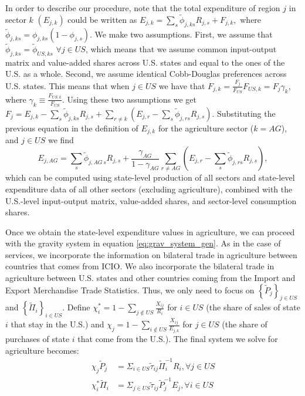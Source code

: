 \documentclass[12pt]{article}
\newcommand{\bs}{\small \begin{eqnarray*}}
\newcommand{\es}{\end{eqnarray*}}
\begin{document}
In order to describe our procedure, note that the total expenditure of region $j$ in sector $k$ $(E_{j,k})$ could be written as  $E_{j,k}=\sum_{s}\tilde{\phi}_{j,ks}R_{j,s}+F_{j,k},$ where $\tilde{\phi}_{j,ks}=\phi_{j,ks}(1-\phi_{j,s})$. We make two assumptions. First, we assume that $\tilde{\phi}_{j,ks}=\tilde{\phi}_{US,ks}$ $\forall j\in US$, which means that we assume common input-output matrix and value-added shares across U.S. states and equal to the ones of the U.S. as a whole. Second, we assume identical Cobb-Douglas preferences across U.S. states. This means that when $j\in US$ we have that $F_{j,k}=\tfrac{F_{j}}{F_{US}} F_{US,k}=F_{j}\gamma_{k}$, where $\gamma_{k}\equiv\tfrac{F_{US,k}}{F_{US}}$. Using these two assumptions we get $F_{j}= E_{j,k}-\sum_{s}\tilde{\phi}_{j,ks}R_{j,s}+\sum_{r\neq k}\left(E_{j,r}-\sum_{s}\tilde{\phi}_{j,rs}R_{j,s}\right).$ Substituting the previous equation in the definition of $E_{j,k}$ for the agriculture sector ($k=AG$), and $j\in US$ we find $$E_{j,AG}=\sum_{s}\tilde{\phi}_{j,AG\,s}R_{j,s}+\dfrac{\gamma_{AG}}{1-\gamma_{AG}}\sum_{r\neq AG}\left(E_{j,r}-\sum_{s}\tilde{\phi}_{j,rs}R_{j,s}\right),$$ which can be computed using state-level production of all sectors and state-level expenditure data of all other sectors (excluding agriculture), combined with the U.S.-level input-output matrix, value-added shares, and sector-level consumption shares. 

Once we obtain the state-level expenditure values in agriculture, we can proceed with the gravity system in equation \eqref{eq:grav_system_gen}. As in the case of services, we incorporate the information on bilateral trade in agriculture between countries that comes from ICIO. We also incorporate the bilateral trade in agriculture between U.S. states and other countries coming from the Import and Export Merchandise Trade Statistics. Thus, we only need to focus on $\left\{ \tilde{P}_{j}\right\}_{j\in US}$  and $\left\{ \tilde{\Pi}_{i}\right\}_{i\in US}$.  Define $\chi^{*}_{i}=1-\sum_{j\notin US}\tfrac{X_{ij}}{R_{i}}$ for $i\in US$ (the share of sales of state $i$ that stay in the U.S.) and $\chi_{j}=1-\sum_{i\notin US}\tfrac{X_{ij}}{E_{j,k}}$ for $j\in US$ (the share of purchases of state $i$ that come from the U.S.). The final system we solve for agriculture becomes:  
\bs
\chi_{j}\tilde{P}_{j} & =\Sigma_{i\in US}\tilde{\tau}_{ij}\tilde{\Pi}_{i}^{-1}R_{i},\forall j\in US \\
\chi^{*}_{i}\tilde{\Pi}_{i} & =\Sigma_{j\in US}\tilde{\tau}_{ij}\tilde{P}_{j}^{-1}E_{j},\forall i\in US
\es
\end{document}
